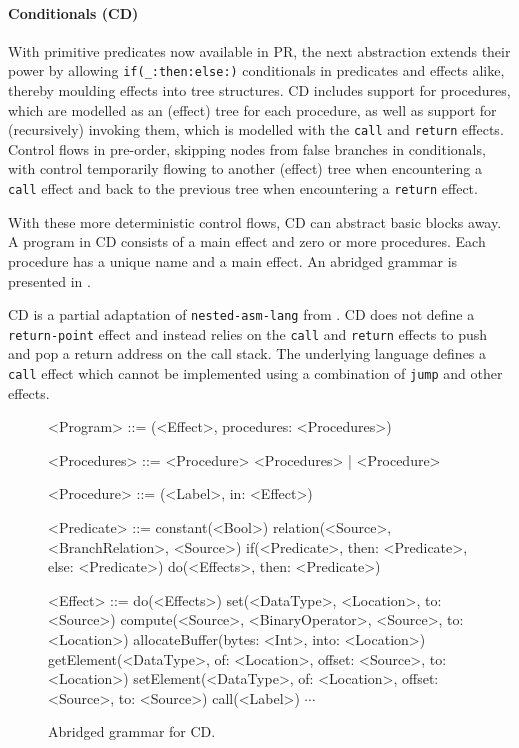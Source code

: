 \documentclass[main.tex]{subfiles}
\begin{document}
\paragraph{Conditionals (CD)} With primitive predicates now available in PR, the next abstraction extends their power by allowing \texttt{if(_:then:else:)} conditionals in predicates and effects alike, thereby moulding effects into tree structures. CD includes support for procedures, which are modelled as an (effect) tree for each procedure, as well as support for (recursively) invoking them, which is modelled with the \texttt{call} and \texttt{return} effects. Control flows in pre-order, skipping nodes from false branches in conditionals, with control temporarily flowing to another (effect) tree when encountering a \texttt{call} effect and back to the previous tree when encountering a \texttt{return} effect.

With these more deterministic control flows, CD can abstract basic blocks away. A program in CD consists of a main effect and zero or more procedures. Each procedure has a unique name and a main effect. An abridged grammar is presented in .

CD is a partial adaptation of \texttt{nested-asm-lang} from \cite{compcourse}. CD does not define a \texttt{return-point} effect and instead relies on the \texttt{call} and \texttt{return} effects to push and pop a return address on the call stack. The underlying language defines a \texttt{call} effect which cannot be implemented using a combination of \texttt{jump} and other effects.

\begin{figure}[ht]
	\begin{grammar}
		
		<Program> ::= (<Effect>, procedures: <Procedures>)
		
		<Procedures> ::= <Procedure> <Procedures> | <Procedure>
		
		<Procedure> ::= (<Label>, in: <Effect>)
		
		<Predicate> ::= constant(<Bool>)
			\alt relation(<Source>, <BranchRelation>, <Source>)
			\alt if(<Predicate>, then: <Predicate>, else: <Predicate>)
			\alt do(<Effects>, then: <Predicate>)
		
		<Effect> ::= do(<Effects>)
			\alt set(<DataType>, <Location>, to: <Source>)
			\alt compute(<Source>, <BinaryOperator>, <Source>, to: <Location>)
			\alt allocateBuffer(bytes: <Int>, into: <Location>)
			\alt getElement(<DataType>, of: <Location>, offset: <Source>, to: <Location>)
			\alt setElement(<DataType>, of: <Location>, offset: <Source>, to: <Source>)
			\alt call(<Label>)
			\alt $\cdots$
		
	\end{grammar}
	\caption{Abridged grammar for CD.}
	\label{bnf:cd}
\end{figure}
\end{document}
